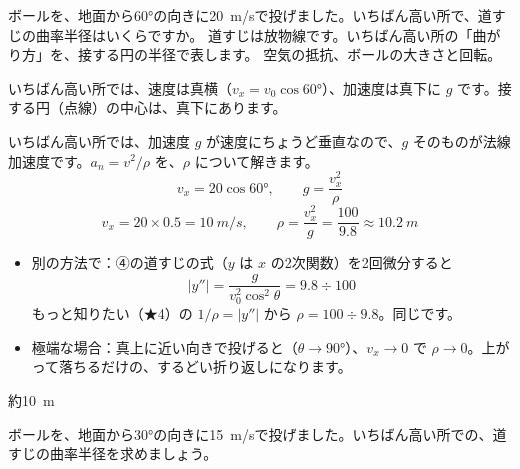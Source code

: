 \begin{phreidai}[投げたボールの道すじの曲がり方]
\label{ph:力-1:ex12}ボールを、地面から60°の向きに\qty{20}{m/s}で投げました。いちばん高い所で、道すじの曲率半径はいくらですか。
\phbamen
道すじは放物線です。いちばん高い所の「曲がり方」を、接する円の半径で表します。
\phmushi
空気の抵抗、ボールの大きさと回転。
\phzu
\noindent\begin{minipage}[c]{0.5\linewidth}\centering
{}
\end{minipage}\hfill
\begin{minipage}[c]{0.47\linewidth}
いちばん高い所では、速度は真横（$v_x=v_0\cos60°$）、加速度は真下に $g$ です。接する円（点線）の中心は、真下にあります。
\end{minipage}
\phriyu
いちばん高い所では、加速度 $g$ が速度にちょうど垂直なので、$g$ そのものが法線加速度です。$a_n=v^2/\rho$ を、$\rho$ について解きます。
\phtateru
\[ v_x=20\cos60°,\qquad g=\frac{v_x^2}{\rho} \]
\phtoku
\[ v_x=20\times0.5=\qty{10}{m/s},\qquad \rho=\frac{v_x^2}{g}=\frac{100}{9.8}\approx\qty{10.2}{m} \]
\phtashikame
\begin{itemize}[leftmargin=1.2\zw, itemsep=1pt, topsep=1pt, label={\color{bkTheme}●}]
\item 別の方法で：④の道すじの式（$y$ は $x$ の2次関数）を2回微分すると
\[ |y''|=\frac{g}{v_0^2\cos^2\theta}=9.8\div100 \]
もっと知りたい（★4）の $1/\rho=|y''|$ から $\rho=100\div9.8$。同じです。
\item 極端な場合：真上に近い向きで投げると（$\theta\to90°$）、$v_x\to0$ で $\rho\to0$。上がって落ちるだけの、するどい折り返しになります。
\end{itemize}
\kotae 約\qty{10}{m}
\end{phreidai}
\begin{jibun}
ボールを、地面から30°の向きに\qty{15}{m/s}で投げました。いちばん高い所での、道すじの曲率半径を求めましょう。
\end{jibun}


